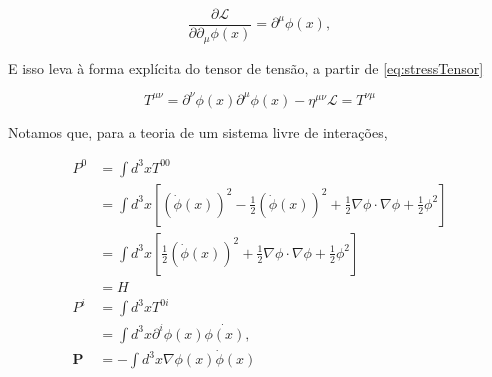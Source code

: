 \begin{equation}
\frac{\partial \mathcal{L}}{\partial \partial_\mu \phi(x)} = \partial^\mu \phi(x) , 
\end{equation}

E isso leva à forma explícita do tensor de tensão, a partir de \eqref{eq:stressTensor} 

\begin{equation}
T^{\mu\nu} = \partial^\nu \phi(x) \partial^\mu \phi(x) - \eta^{\mu\nu} \mathcal{L} = T^{\nu\mu}
\end{equation}

Notamos que, para a teoria de um sistema livre de interações,

\begin{equation}
\begin{aligned}
P^0 &= \int d^3x T^{00} \\
&= \int d^3x \left[ \left( \dot{\phi}(x) \right)^2 - \frac{1}{2} \left( \dot{\phi}(x) \right)^2 + \frac{1}{2} \nabla \phi \cdot \nabla \phi + \frac{1}{2} \phi^2 \right] \\
&= \int d^3x \left[ \frac{1}{2} \left( \dot{\phi}(x) \right)^2 + \frac{1}{2} \nabla \phi \cdot \nabla \phi + \frac{1}{2} \phi^2 \right] \\
&= H \\
P^i &= \int d^3x T^{0i} \\
&= \int d^3x \partial^i \phi(x) \dot{\phi(x)}, \\
\boldsymbol{P} &= - \int d^3x \nabla \phi(x) \dot{\phi}(x) \label{eq:HeP}
\end{aligned}
\end{equation}